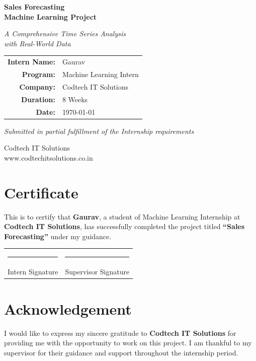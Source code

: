 \documentclass[12pt,a4paper]{report}
\begin{document}
\begin{titlepage}
    \centering
    \vspace*{2cm}
    {\Huge\bfseries Sales Forecasting\\Machine Learning Project\par}
    \vspace{1.5cm}
    {\Large\textit{A Comprehensive Time Series Analysis\\with Real-World Data}\par}
    \vspace{2cm}
    {\Large
    \begin{tabular}{rl}
    \textbf{Intern Name:} & Gaurav \\
    \textbf{Program:} & Machine Learning Intern \\
    \textbf{Company:} & Codtech IT Solutions \\
    \textbf{Duration:} & 8 Weeks \\
    \textbf{Date:} & \today \\
    \end{tabular}\par}
    \vspace{2cm}
    {\large\textit{Submitted in partial fulfillment of the Internship requirements}\par}
    \vfill
    {\small Codtech IT Solutions\\www.codtechitsolutions.co.in\par}
\end{titlepage}

\chapter*{Certificate}
This is to certify that \textbf{Gaurav}, a student of Machine Learning Internship at \textbf{Codtech IT Solutions}, has successfully completed the project titled \textbf{``Sales Forecasting''} under my guidance.

\vspace{2cm}
\noindent\begin{tabular}{p{6cm}p{6cm}}
\rule{5cm}{0.4pt} & \rule{5cm}{0.4pt} \\
Intern Signature & Supervisor Signature \\
\end{tabular}

\chapter*{Acknowledgement}
I would like to express my sincere gratitude to \textbf{Codtech IT Solutions} for providing me with the opportunity to work on this project. I am thankful to my supervisor for their guidance and support throughout the internship period.
\end{document}
